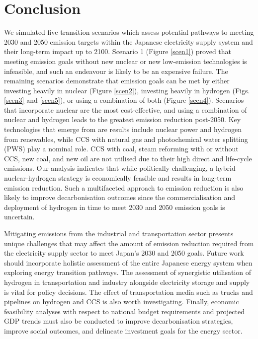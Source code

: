 \section{Conclusion} \label{Conclusion}

We simulated five transition scenarios which assess potential pathways to meeting 2030 and 2050 emission targets within the Japanese electricity supply system and their long-term impact up to 2100. Scenario 1 (Figure \ref{scen1}) proved that meeting emission goals without new nuclear or new low-emission technologies is infeasible, and such an endeavour is likely to be an expensive failure. The remaining scenarios demonstrate that emission goals can be met by either investing heavily in nuclear (Figure \ref{scen2}), investing heavily in hydrogen (Figs. \ref{scen3} and \ref{scen5}), or using a combination of both (Figure \ref{scen4}). Scenarios that incorporate nuclear are the most cost-effective, and using a combination of nuclear and hydrogen leads to the greatest emission reduction post-2050. Key technologies that emerge from are results include nuclear power and hydrogen from renewables, while \gls{CCS} with natural gas and photochemical water splitting (\gls{PWS}) play a nominal role. CCS with coal, steam reforming with or without CCS, new coal, and new oil are not utilised due to their high direct and life-cycle emissions. Our analysis indicates that while politically challenging, a hybrid nuclear-hydrogen strategy is economically feasible and results in long-term emission reduction. Such a multifaceted approach to emission reduction is also likely to improve decarbonisation outcomes since the commercialisation and deployment of hydrogen in time to meet 2030 and 2050 emission goals is uncertain.

Mitigating emissions from the industrial and transportation sector presents unique challenges that may affect the amount of emission reduction required from the electricity supply sector to meet Japan's 2030 and 2050 goals. Future work should incorporate holistic assessment of the entire Japanese energy system when exploring energy transition pathways. The assessment of synergistic utilisation of hydrogen in transportation and industry alongside electricity storage and supply is vital for policy decisions. The effect of transportation media such as trucks and pipelines on hydrogen and CCS is also worth investigating.  Finally, economic feasibility analyses with respect to national budget requirements and projected GDP trends must also be conducted to improve decarbonisation strategies, improve social outcomes, and delineate investment goals for the energy sector.


